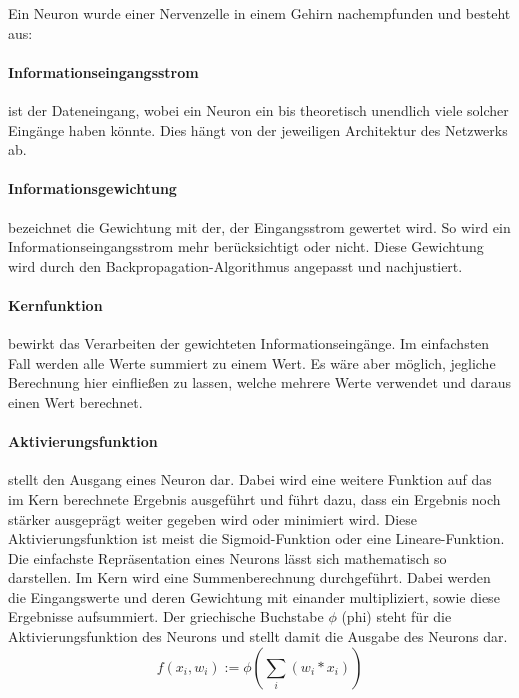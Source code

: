Ein Neuron wurde einer Nervenzelle in einem Gehirn nachempfunden und besteht aus:
\paragraph{Informationseingangsstrom} ist der Dateneingang, wobei ein Neuron ein bis theoretisch unendlich viele solcher Eingänge haben könnte. 
Dies hängt von der jeweiligen Architektur des Netzwerks ab.

\paragraph{Informationsgewichtung} bezeichnet die Gewichtung mit der, der Eingangsstrom gewertet wird. 
So wird ein Informationseingangsstrom mehr berücksichtigt oder nicht. 
Diese Gewichtung wird durch den Backpropagation-Algorithmus angepasst und nachjustiert.

\paragraph{Kernfunktion} bewirkt das Verarbeiten der gewichteten Informationseingänge. 
Im einfachsten Fall werden alle Werte summiert zu einem Wert. 
Es wäre aber möglich, jegliche Berechnung hier einfließen zu lassen, welche mehrere Werte verwendet und daraus einen Wert berechnet.

\paragraph{Aktivierungsfunktion} stellt den Ausgang eines Neuron dar. 
Dabei wird eine weitere Funktion auf das im Kern berechnete Ergebnis ausgeführt und führt dazu, dass ein Ergebnis noch stärker ausgeprägt weiter gegeben wird oder minimiert wird. 
Diese Aktivierungsfunktion ist meist die Sigmoid-Funktion oder eine Lineare-Funktion. 
\\

Die einfachste Repräsentation eines Neurons lässt sich mathematisch so darstellen.
Im Kern wird eine Summenberechnung durchgeführt. 
Dabei werden die Eingangswerte und deren Gewichtung mit einander multipliziert, sowie diese Ergebnisse aufsummiert.
Der griechische Buchstabe $\phi$ (phi) steht für die Aktivierungsfunktion des Neurons und stellt damit die Ausgabe des Neurons dar.
\begin{equation}
	f(x_i, w_i) := \phi ( \sum\limits_{i}{(w_i * x_i)})
\end{equation}


